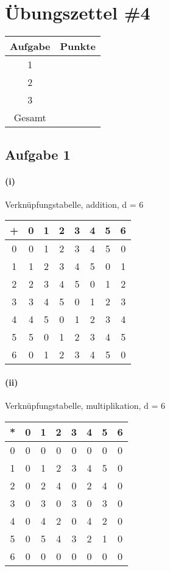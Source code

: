 \documentclass{article}
\begin{document}
\section*{Übungszettel \#4} %

\begin{center}
    \begin{tabular}{|c|c|}
        \hline
        Aufgabe & Punkte \\
        \hline
        1 & \\
        2 & \\
        3 & \\
        \hline
        Gesamt & \\
        \hline
    \end{tabular}
\end{center}

\subsection*{Aufgabe 1}
\paragraph*{(i)} Verknüpfungstabelle, addition, d = 6\\
\begin{tabular}{c|ccccccc}
    + & 0 & 1 & 2 & 3 & 4 & 5 & 6 \\
    \hline
    0 & 0 & 1 & 2 & 3 & 4 & 5 & 0 \\
    1 & 1 & 2 & 3 & 4 & 5 & 0 & 1 \\
    2 & 2 & 3 & 4 & 5 & 0 & 1 & 2 \\
    3 & 3 & 4 & 5 & 0 & 1 & 2 & 3 \\
    4 & 4 & 5 & 0 & 1 & 2 & 3 & 4 \\
    5 & 5 & 0 & 1 & 2 & 3 & 4 & 5 \\
    6 & 0 & 1 & 2 & 3 & 4 & 5 & 0 \\
\end{tabular}
\paragraph*{(ii)} Verknüpfungstabelle, multiplikation, d = 6\\
\begin{tabular}{c|ccccccc}
    * & 0 & 1 & 2 & 3 & 4 & 5 & 6 \\
    \hline
    0 & 0 & 0 & 0 & 0 & 0 & 0 & 0 \\
    1 & 0 & 1 & 2 & 3 & 4 & 5 & 0 \\
    2 & 0 & 2 & 4 & 0 & 2 & 4 & 0 \\
    3 & 0 & 3 & 0 & 3 & 0 & 3 & 0 \\
    4 & 0 & 4 & 2 & 0 & 4 & 2 & 0 \\
    5 & 0 & 5 & 4 & 3 & 2 & 1 & 0 \\
    6 & 0 & 0 & 0 & 0 & 0 & 0 & 0 \\
\end{tabular}
\end{document}
